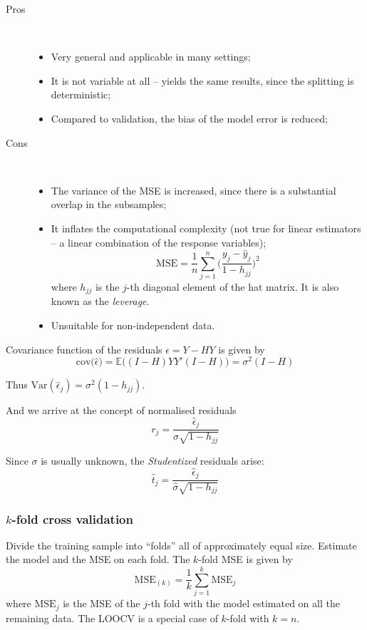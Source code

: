 \documentclass[a4paper]{article}
\newcommand{\Ex}[0]{{\mathbb{E}}}
\newcommand{\Var}[0]{{\text{Var}}}
\begin{document}
\begin{description}
	\item[Pros] \hfill\\
		\begin{itemize}
			\item Very general and applicable in many settings;
			\item It is not variable at all -- yields the same results, since the splitting is deterministic;
			\item Compared to validation, the bias of the model error is reduced;
		\end{itemize}
	\item[Cons] \hfill\\
		\begin{itemize}
			\item The variance of the MSE is increased, since there is a substantial overlap in the subsamples;
			\item It inflates the computational complexity (not true for linear estimators -- a linear combination of the response variables);
			\[\text{MSE} = \frac{1}{n}\sum_{j=1}^n \Big(\frac{y_j - \hat{y}_j}{1-h_{jj}}\Big)^2\]
			where $h_{jj}$ is the $j$-th diagonal element of the hat matrix. It is also known as the \emph{leverage}.
			\item Unsuitable for non-independent data.
		\end{itemize}
\end{description}

Covariance function of the residuals $\epsilon = Y - H Y$ is given by 
\[\text{cov}\big(\hat{\epsilon}\big) = \Ex\big( (I-H)YY'(I-H) \big) = \sigma^2 (I-H)\]

Thus $\Var(\hat{\epsilon}_j) = \sigma^2 (1-h_{jj})$.

And we arrive at the concept of normalised residuals
\[r_j = \frac{\hat{\epsilon}_j}{\sigma \sqrt{1-h_{jj}}}\]

Since $\sigma$ is usually unknown, the \emph{Studentized} residuals arise:
\[ \hat{t}_j = \frac{\hat{\epsilon}_j}{\hat{\sigma} \sqrt{1-h_{jj}}}\]


\subsubsection{$k$-fold cross validation} %
\label{ssub:_k_fold_cross_validation}

Divide the training sample into ``folds'' all of approximately equal size. Estimate the model and the MSE on each fold. The $k$-fold MSE is given by 
\[\text{MSE}_{(k)} = \frac{1}{k}\sum_{j=1}^k \text{MSE}_j \]
where $\text{MSE}_j$ is the MSE of the $j$-th fold with the model estimated on all the remaining data. The LOOCV is a special case of $k$-fold with $k=n$.
\end{document}
